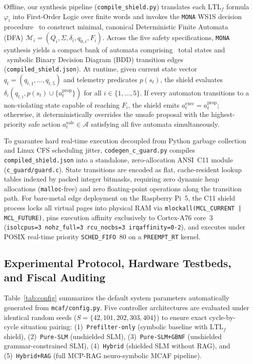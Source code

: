 \documentclass{ieeeaccess}
\begin{document}
Offline, our synthesis pipeline (\texttt{compile\_shield.py}) translates each $\mathrm{LTL}_f$ formula $\varphi_i$ into First-Order Logic over finite words and invokes the \texttt{MONA} WS1S decision procedure~\cite{klarlund2001mona} to construct minimal, canonical Deterministic Finite Automata (DFA) $\mathcal{M}_i = (Q_i, \Sigma, \delta_i, q_{0,i}, F_i)$. Across the five safety specifications, \texttt{MONA} synthesis yields a compact bank of automata comprising \ShieldStatesTotal~total states and \ShieldEdgesTotal~symbolic Binary Decision Diagram (BDD) transition edges (\texttt{compiled\_shield.json}). At runtime, given current state vector $q_t = (q_{t,1}, \dots, q_{t,5})$ and telemetry predicates $p(s_t)$, the shield evaluates $\delta_i(q_{t,i}, p(s_t) \cup \{a_t^{\mathrm{prop}}\})$ for all $i \in \{1,\dots,5\}$. If every automaton transitions to a non-violating state capable of reaching $F_i$, the shield emits $a_t^{\mathrm{exec}} = a_t^{\mathrm{prop}}$; otherwise, it deterministically overrides the unsafe proposal with the highest-priority safe action $a_t^{\mathrm{safe}} \in \mathcal{A}$ satisfying all five automata simultaneously.

To guarantee hard real-time execution decoupled from Python garbage collection and Linux CFS scheduling jitter, \texttt{codegen\_c\_guard.py} compiles \texttt{compiled\_shield.json} into a standalone, zero-allocation ANSI~C11 module (\texttt{c\_guard/guard.c}). State transitions are encoded as flat, cache-resident lookup tables indexed by packed integer bitmasks, requiring zero dynamic heap allocations (\texttt{malloc}-free) and zero floating-point operations along the transition path. For bare-metal edge deployment on the Raspberry Pi~5, the C11 shield process locks all virtual pages into physical RAM via \texttt{mlockall(MCL\_CURRENT | MCL\_FUTURE)}, pins execution affinity exclusively to Cortex-A76 core~3 (\texttt{isolcpus=3 nohz\_full=3 rcu\_nocbs=3 irqaffinity=0-2}), and executes under POSIX real-time priority \texttt{SCHED\_FIFO}~80 on a \texttt{PREEMPT\_RT} kernel.

\subsection{Experimental Protocol, Hardware Testbeds, and Fiscal Auditing}
Table~\ref{tab:config} summarizes the default system parameters automatically generated from \texttt{mcaf/config.py}. Five controller architectures are evaluated under identical random seeds ($S = \{42, 101, 202, 303, 404\}$) to ensure exact cycle-by-cycle situation pairing: (1)~\texttt{Prefilter-only} (symbolic baseline with $\mathrm{LTL}_f$ shield), (2)~\texttt{Pure-SLM} (unshielded SLM), (3)~\texttt{Pure-SLM+GBNF} (unshielded grammar-constrained SLM), (4)~\texttt{Hybrid} (shielded SLM without RAG), and (5)~\texttt{Hybrid+RAG} (full MCP-RAG neuro-symbolic MCAF pipeline).
\end{document}
